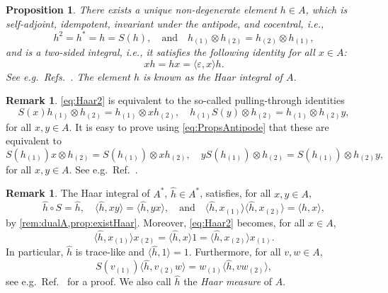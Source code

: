 \documentclass[a4paper,10pt]{amsart}
\newcommand{\eval}[2]{\langle #1 , #2\rangle}
\newcommand{\newterm}[1]{\emph{#1}}
\newtheorem{proposition}[theorem]{Proposition}
\theoremstyle{definition}
\newtheorem{remark}[theorem]{Remark}
\begin{document}
\begin{proposition}\label{prop:existHaar}
There exists a unique non-degenerate element $h\in A$, which is self-adjoint, idempotent, invariant under the antipode, and cocentral, i.e.,
\begin{equation}
\label{eq:Haar}
	h^2 = h^* = h = S(h),
    \quad
        \text{and}
        \quad
    h_{(1)}\otimes h_{(2)} = h_{(2)}\otimes h_{(1)},
\end{equation}
and is a two-sided integral, i.e., it satisfies the following identity for all $x\in A$:
\begin{equation}
\label{eq:Haar2}
    xh = hx = \eval{\varepsilon}{x} h.
\end{equation}
See e.g.~Refs.~\cite{montgomery_representation_2001,bohm_weak_1999}. The element $h$ is known as the \newterm{Haar integral} of $A$.
\end{proposition}

\begin{remark}
\cref{eq:Haar2} is equivalent to the so-called pulling-through identities
\begin{equation}\label{eq:PT}
	S(x) h_{(1)} \otimes h_{(2)} = h_{(1)} \otimes x h_{(2)},
	\quad
	h_{(1)} S(y) \otimes h_{(2)}  = h_{(1)} \otimes h_{(2)} y,
\end{equation}
for all $x,y\in A$. It is easy to prove using \cref{eq:PropsAntipode} that these are equivalent to
\begin{equation}
\label{eq:PTmodified}
	S(h_{(1)}) x\otimes h_{(2)} = S(h_{(1)})\otimes xh_{(2)},
	\quad
	y S(h_{(1)})\otimes h_{(2)}  = S(h_{(1)})\otimes h_{(2)}y,
\end{equation}
for all $x,y\in A$. See e.g.~Ref.~\cite[Lemma~3.2]{bohm_weak_1999}.
\end{remark}

\begin{remark}
The Haar integral of $A^*$, $\hat{h}\in A^*$, satisfies, for all $x,y\in A$,
\begin{equation}
\label{eq:DualHaar}
	\hat{h} \circ S
    =
    \hat{h},
    \quad
    \eval{\hat{h}}{xy}
    =
    \eval{\hat{h}}{yx},
    \quad
        \text{and}
        \quad
    \eval{\hat{h}}{x_{(1)}} \eval{\hat{h}}{x_{(2)}}
    =
    \eval{\hat{h}}{x},
\end{equation}
by \cref{rem:dualA,prop:existHaar}. Moreover, \cref{eq:Haar2} becomes, for all $x\in A$,
\begin{equation}
\label{eq:DualHaar2}
    \eval{ \hat{h} }{ x_{(1)} } x_{(2)} 
    =
    \eval{ \hat{h} }{ x } 1
    = 
    \eval{ \hat{h} }{ x_{(2)} } x_{(1)}.
\end{equation}
In particular, $\hat{h}$ is trace-like and $\eval{\hat{h}}{1} = 1$. Furthermore, for all $v,w\in A$,
\begin{equation}\label{eq:propHaarExchXY}
    S(v_{(1)}) \eval{\hat{h}}{v_{(2)}w} = w_{(1)} \eval{\hat{h}}{v w_{(2)}},
\end{equation}
see e.g.~Ref.~\cite[Proposition~1.1]{vandaele_algebraic_2025} for a proof.
We also call $\hat{h}$ the \newterm{Haar measure} of $A$.
\end{remark}
\end{document}
